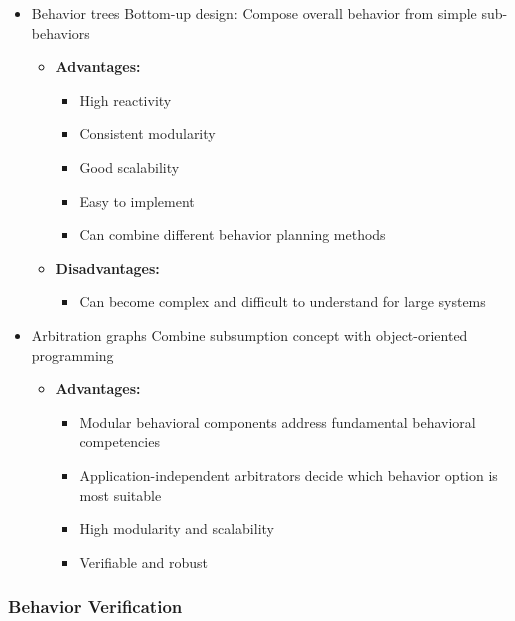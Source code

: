 \begin{itemize}
\item Behavior trees
Bottom-up design: Compose overall behavior from simple sub-behaviors \cite{brooks_robust_1986}
          \begin{itemize}
              \item \textbf{Advantages:}
                    \begin{itemize}
                        \item High reactivity
                        \item Consistent modularity
                        \item Good scalability
                        \item Easy to implement
                        \item Can combine different behavior planning methods
                    \end{itemize}
              \item \textbf{Disadvantages:}
                    \begin{itemize}
                        \item Can become complex and difficult to understand for large systems
\end{itemize}
\end{itemize}

\item Arbitration graphs
Combine subsumption concept with object-oriented programming \cite{lauer_cognitive_2010}
          \begin{itemize}
              \item \textbf{Advantages:}
                    \begin{itemize}
                        \item Modular behavioral components address fundamental behavioral competencies
                        \item Application-independent arbitrators decide which behavior option is most suitable
                        \item High modularity and scalability
                        \item Verifiable and robust
                    \end{itemize}
          \end{itemize}
\end{itemize}

\subsubsection{Behavior Verification}

